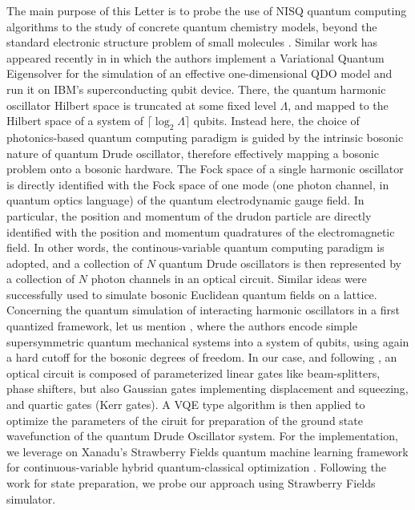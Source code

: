 \documentclass[reprint, amsmath, amssymb, floatfix, aps, pra]{revtex4-2}
\begin{document}
    The main purpose of this Letter is to probe the use of NISQ quantum computing algorithms to the study of concrete quantum chemistry models, beyond the standard electronic structure problem of small molecules \cite{peruzzo2014variational, kandala2017hardware, nam2020ground}. Similar work has appeared recently in \cite{anderson2022coarse} in which the authors implement a Variational Quantum Eigensolver for the simulation of an effective one-dimensional QDO model and run it on IBM's superconducting qubit device. There, the quantum harmonic oscillator Hilbert space is truncated at some fixed level $\Lambda$, and mapped to the Hilbert space of a system of $\lceil\log_2\Lambda\rceil$ qubits. Instead here, the choice of photonics-based quantum computing paradigm is guided by the intrinsic bosonic nature of quantum Drude oscillator, therefore effectively mapping a bosonic problem onto a bosonic hardware. The Fock space of a single harmonic oscillator is directly identified with the Fock space of one mode (one photon channel, in quantum optics language) of the quantum electrodynamic gauge field. In particular, the position and momentum of the drudon particle are directly identified with the position and momentum quadratures of the electromagnetic field. In other words, the continous-variable quantum computing paradigm \cite{lloyd1999quantum, pati2000quantum, pati2003deutsch, braunstein2005quantum, andersen2010continuous, lomonaco2002continuous, zhong2020quantum, tillmann2013experimental} is adopted, and a collection of $N$ quantum Drude oscillators is then represented by a collection of $N$ photon channels in an optical circuit. Similar ideas were successfully used to simulate bosonic Euclidean quantum fields \cite{marshall2015quantum, yeter2022quantum} on a lattice. Concerning the quantum simulation of interacting harmonic oscillators in a first quantized framework, let us mention \cite{Culver:2021rxo}, where the authors encode simple supersymmetric quantum mechanical systems into a system of qubits, using again a hard cutoff for the bosonic degrees of freedom. In our case, and following  \cite{schuld2021machine, killoran2019continuous, arrazola2019machine, enomoto2022continuous, peruzzo2014variational}, an optical circuit is composed of parameterized linear gates like beam-splitters, phase shifters, but also Gaussian gates implementing displacement and squeezing, and quartic gates (Kerr gates). A VQE type algorithm is then applied to optimize the parameters of the ciruit for preparation of the ground state wavefunction of the quantum Drude Oscillator system. For the implementation, we leverage on Xanadu's Strawberry Fields quantum machine learning framework for continuous-variable hybrid quantum-classical optimization \cite{schuld2021machine, killoran2019continuous, arrazola2019machine, bromley2020applications}. Following the work \cite{arrazola2019machine} for state preparation, we probe our approach using Strawberry Fields simulator.
\end{document}
